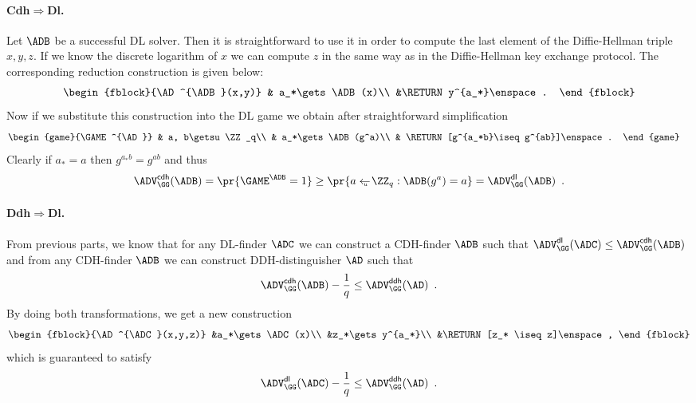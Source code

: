 \documentclass{crypto-exercise}
\begin{document}
\begin{solution}
  \paragraph{Cdh$\Rightarrow$Dl.} Let $\ADB$ be a successful DL
  solver. Then it is straightforward to use it in order to compute the
  last element of the Diffie-Hellman triple $x,y,z$. If we know the
  discrete logarithm of $x$ we can compute $z$ in the same way as in
  the Diffie-Hellman key exchange protocol. The corresponding
  reduction construction is given below:
  \begin{align*}
    \begin{fblock}{\AD^{\ADB}(x,y)}
      & a_*\gets \ADB(x)\\
      &\RETURN y^{a_*}\enspace. 
    \end{fblock}
  \end{align*}
  Now if we substitute this construction into the DL game we obtain
  after straightforward simplification
  \begin{align*}
    &\begin{game}{\GAME^{\AD}}
      & a, b\getsu \ZZ_q\\
      & a_*\gets \ADB(g^a)\\
      & \RETURN [g^{a_*b}\iseq g^{ab}]\enspace.
    \end{game}
  \end{align*}
  Clearly if $a_*=a$ then $g^{a_*b}= g^{ab}$ and thus
  \begin{align*}
   \ADVCDH{\GG}{\ADB}= \pr{\GAME^{\ADB}=1}\geq\pr{a\getsu\ZZ_q:\ADB(g^a)=a}=\ADVDL{\GG}{\ADB}\enspace.
  \end{align*}

  \paragraph{Ddh$\Rightarrow$Dl.} From previous parts, we know that
  for any DL-finder $\ADC$ we can construct a CDH-finder $\ADB$ such
  that $\ADVDL{\GG}{\ADC}\leq\ADVCDH{\GG}{\ADB}$ and from any
  CDH-finder $\ADB$ we can construct DDH-distinguisher $\AD$ such that
  \begin{align*}
    \ADVCDH{\GG}{\ADB}-\frac{1}{q}\leq\ADVDDH{\GG}{\AD}\enspace.
  \end{align*}
  By doing both transformations, we get a new construction
  \begin{align*}
    \begin{fblock}{\AD^{\ADC}(x,y,z)}
      &a_*\gets \ADC(x)\\
      &z_*\gets y^{a_*}\\
      &\RETURN [z_* \iseq z]\enspace,
    \end{fblock}
  \end{align*}
  which is guaranteed to satisfy 
  \begin{align*}
    \ADVDL{\GG}{\ADC}-\frac{1}{q}\leq\ADVDDH{\GG}{\AD}\enspace.
  \end{align*}
\end{solution}
\end{document}
